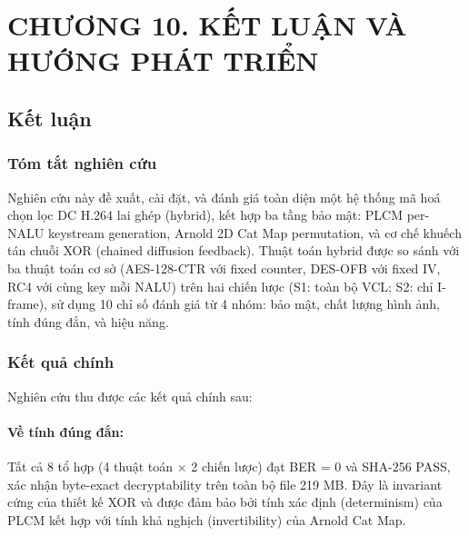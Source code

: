 \clearpage
{}
\section*{CHƯƠNG 10. KẾT LUẬN VÀ HƯỚNG PHÁT TRIỂN}
\setcounter{section}{10}
\setcounter{subsection}{0}
\setcounter{figure}{0}
\setcounter{table}{0}
\setcounter{equation}{0}

\subsection{Kết luận}

\subsubsection{Tóm tắt nghiên cứu}

Nghiên cứu này đề xuất, cài đặt, và đánh giá toàn diện một hệ thống mã hoá chọn lọc
DC H.264 lai ghép (hybrid), kết hợp ba tầng bảo mật: PLCM per-NALU keystream
generation, Arnold 2D Cat Map permutation, và cơ chế khuếch tán chuỗi XOR
(chained diffusion feedback). Thuật toán hybrid được so sánh với ba thuật toán
cơ sở (AES-128-CTR với fixed counter, DES-OFB với fixed IV, RC4 với cùng key
mỗi NALU) trên hai chiến lược (S1: toàn bộ VCL; S2: chỉ I-frame), sử dụng
10 chỉ số đánh giá từ 4 nhóm: bảo mật, chất lượng hình ảnh, tính đúng đắn, và hiệu năng.

\subsubsection{Kết quả chính}

Nghiên cứu thu được các kết quả chính sau:

\paragraph{Về tính đúng đắn:}
Tất cả 8 tổ hợp (4 thuật toán $\times$ 2 chiến lược) đạt BER = 0 và SHA-256 PASS,
xác nhận byte-exact decryptability trên toàn bộ file 219 MB. Đây là invariant cứng
của thiết kế XOR và được đảm bảo bởi tính xác định (determinism) của PLCM kết hợp
với tính khả nghịch (invertibility) của Arnold Cat Map.


